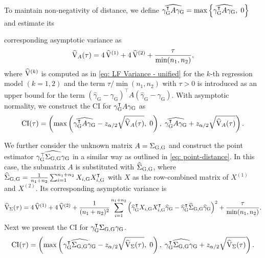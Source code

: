 To maintain non-negativity of distance, we define 
$
\widehat{\gamma_{\mathrm{G}}^\intercal A \gamma_{\mathrm{G}}} = \max\left\{\widehat{\gamma_{\mathrm{G}}^\intercal A \gamma_{\mathrm{G}}}, \; 0\right\} 
$ and estimate its{ corresponding asymptotic variance as
\[
\widehat{\rm V}_{A}(\tau) = 4\,\widehat{\rm V}^{(1)} + 4\,\widehat{\rm V}^{(2)} + \frac{\tau}{\min(n_1,n_2)},
\]
where $\widehat{\rm V}^{(k)}$ is computed as in \eqref{eq: LF Variance - unified} for the $k$-th regression model $(k = 1,2)$ and the term $\tau/\min(n_1,n_2)$ with $\tau > 0$ is introduced as an upper bound for the term $( \widehat{\gamma}_{\textrm{G}} - \gamma_{\textrm{G}} )^\intercal A ( \widehat{\gamma}_{\textrm{G}} - \gamma_{\textrm{G}})$. With asymptotic normality, we construct the CI for $\gamma^\intercal_{\mathrm{G}} A \gamma_{\mathrm{G}}$ as
$${\rm CI}(\tau) = \left(\max\left(\widehat{\gamma_{\mathrm{G}}^\intercal A \gamma_{\mathrm{G}}} - z_{\alpha/2}\sqrt{\widehat{\rm V}_{A}(\tau)}, \; 0\right),\; \widehat{\gamma_{\mathrm{G}}^\intercal A \gamma_{\mathrm{G}}} + z_{\alpha/2}\sqrt{\widehat{\rm V}_{A}(\tau)}\right).$$

We further consider the unknown matrix $A=\Sigma_{\mathrm{G},\mathrm{G}}$ and construct the point estimator $\widehat{\gamma_{\mathrm{G}}^\top \Sigma_{\mathrm{G},\mathrm{G}} \gamma_{\mathrm{G}}}$ in a similar way as outlined in \eqref{eq: point-distance}. In this case, the submatrix $A$ is substituted with $\widehat{\Sigma}_{\mathrm{G},\mathrm{G}}$, where $\widehat{\Sigma}_{\mathrm{G},\mathrm{G}} =\frac{1}{n_1 + n_2} \sum_{i=1}^{n_1+n_2} X_{i,\mathrm{G}} X_{i, \mathrm{G}}^\intercal$ with $X$ as the row-combined matrix of $X^{(1)}$ and $X^{(2)}$. Its corresponding asymptotic variance is
\[
\widehat{\rm V}_{\Sigma}(\tau) = 4\, \widehat{\rm V}^{(1)} + 4\,\widehat{\rm V}^{(2)} + \frac{1}{(n_1 + n_2)^2}\sum_{i=1}^{n_1+n_2} \left(\widehat{\gamma}_{\mathrm{G}}^{\intercal}X_{i,\mathrm{G}}X_{i,\mathrm{G}}^{\intercal}\widehat{\gamma}_{\mathrm{G}} - \widehat{\gamma}_{\mathrm{G}}^{\intercal}\widehat{\Sigma}_{\mathrm{G},\mathrm{G}}\widehat{\gamma}_{\mathrm{G}}\right)^2 + \frac{\tau}{\min(n_1,n_2)}.
\]
Next we present the CI for $\gamma_{\mathrm{G}}^{\intercal}\Sigma_{\mathrm{G}, \mathrm{G}}\gamma_{\mathrm{G}}$. %
$${\rm CI}(\tau) = \left(\max\left(\widehat{\gamma_{\mathrm{G}}^\intercal \Sigma_{\mathrm{G},\mathrm{G}} \gamma_{\mathrm{G}}} - z_{\alpha/2}\sqrt{\widehat{\rm V}_{\Sigma}(\tau)}, \; 0\right), \;\widehat{\gamma_{\mathrm{G}}^\intercal \Sigma_{\mathrm{G},\mathrm{G}} \gamma_{\mathrm{G}}} + z_{\alpha/2}\sqrt{\widehat{\rm V}_{\Sigma}(\tau)}\right).$$
}



